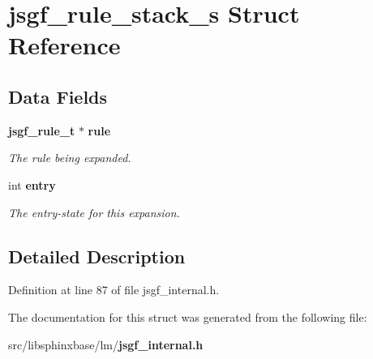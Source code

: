 \section{jsgf\-\_\-rule\-\_\-stack\-\_\-s Struct Reference}
\label{structjsgf__rule__stack__s}
\subsection*{Data Fields}
\begin{DoxyCompactItemize}
\item 
{\bf jsgf\-\_\-rule\-\_\-t} $\ast$ {\bf rule}\label{structjsgf__rule__stack__s_a5fd5facd2b790c949ef2efa80b07148a}

\begin{DoxyCompactList}\small\item\em The rule being expanded. \end{DoxyCompactList}\item 
int {\bf entry}\label{structjsgf__rule__stack__s_a56107dc6cc50d45a5c1811785e8169b7}

\begin{DoxyCompactList}\small\item\em The entry-\/state for this expansion. \end{DoxyCompactList}\end{DoxyCompactItemize}


\subsection{Detailed Description}


Definition at line 87 of file jsgf\-\_\-internal.\-h.



The documentation for this struct was generated from the following file\-:\begin{DoxyCompactItemize}
\item 
src/libsphinxbase/lm/{\bf jsgf\-\_\-internal.\-h}\end{DoxyCompactItemize}
